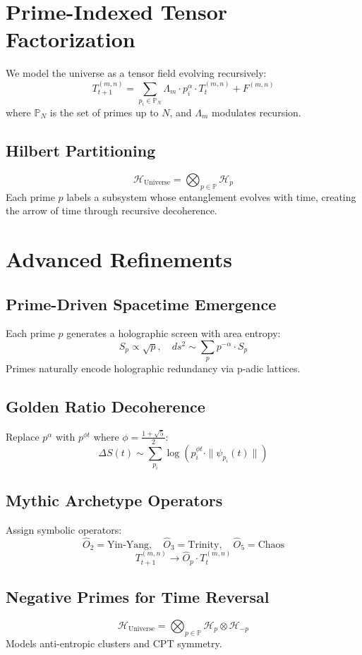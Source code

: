 \documentclass[12pt]{article}
\begin{document}
\section{Prime-Indexed Tensor Factorization}
We model the universe as a tensor field evolving recursively:
\[
T_{t+1}^{(m,n)} = \sum_{p_i \in \mathbb{P}_N} \Lambda_m \cdot p_i^\alpha \cdot T_t^{(m,n)} + F^{(m,n)}
\]
where $\mathbb{P}_N$ is the set of primes up to $N$, and $\Lambda_m$ modulates recursion.

\subsection{Hilbert Partitioning}
\[
\mathcal{H}_\text{Universe} = \bigotimes_{p \in \mathbb{P}} \mathcal{H}_p
\]
Each prime $p$ labels a subsystem whose entanglement evolves with time, creating the arrow of time through recursive decoherence.

\section{Advanced Refinements}

\subsection{Prime-Driven Spacetime Emergence}
Each prime $p$ generates a holographic screen with area entropy:
\[
S_p \propto \sqrt{p}, \quad ds^2 \sim \sum_p p^{-\alpha} \cdot S_p
\]
Primes naturally encode holographic redundancy via p-adic lattices.

\subsection{Golden Ratio Decoherence}
Replace $p^\alpha$ with $p^{\phi t}$ where $\phi = \frac{1 + \sqrt{5}}{2}$:
\[
\Delta S(t) \sim \sum_{p_i} \log \left( p_i^{\phi t} \cdot \| \psi_{p_i}(t) \| \right)
\]

\subsection{Mythic Archetype Operators}
Assign symbolic operators:
\[
\hat{O}_2 = \text{Yin-Yang}, \quad \hat{O}_3 = \text{Trinity}, \quad \hat{O}_5 = \text{Chaos}
\]
\[
T_{t+1}^{(m,n)} \rightarrow \hat{O}_p \cdot T_t^{(m,n)}
\]

\subsection{Negative Primes for Time Reversal}
\[
\mathcal{H}_\text{Universe} = \bigotimes_{p \in \mathbb{P}} \mathcal{H}_p \otimes \mathcal{H}_{-p}
\]
Models anti-entropic clusters and CPT symmetry.
\end{document}
